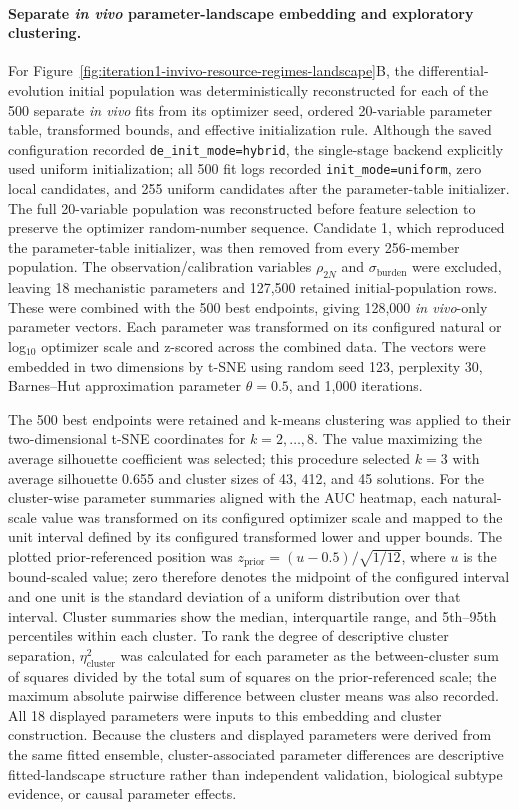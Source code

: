 \documentclass[11pt]{article}
\begin{document}
\paragraph{Separate \textit{in vivo} parameter-landscape embedding and exploratory clustering.}
For Figure~\ref{fig:iteration1-invivo-resource-regimes-landscape}B, the differential-evolution initial population was deterministically reconstructed for each of the 500 separate \textit{in vivo} fits from its optimizer seed, ordered 20-variable parameter table, transformed bounds, and effective initialization rule. Although the saved configuration recorded \texttt{de\_init\_mode=hybrid}, the single-stage backend explicitly used uniform initialization; all 500 fit logs recorded \texttt{init\_mode=uniform}, zero local candidates, and 255 uniform candidates after the parameter-table initializer. The full 20-variable population was reconstructed before feature selection to preserve the optimizer random-number sequence. Candidate 1, which reproduced the parameter-table initializer, was then removed from every 256-member population. The observation/calibration variables \(\rho_{2N}\) and \(\sigma_{\mathrm{burden}}\) were excluded, leaving 18 mechanistic parameters and 127,500 retained initial-population rows. These were combined with the 500 best endpoints, giving 128,000 \textit{in vivo}-only parameter vectors. Each parameter was transformed on its configured natural or log$_{10}$ optimizer scale and z-scored across the combined data. The vectors were embedded in two dimensions by t-SNE using random seed 123, perplexity 30, Barnes--Hut approximation parameter \(\theta=0.5\), and 1,000 iterations.

The 500 best endpoints were retained and k-means clustering was applied to their two-dimensional t-SNE coordinates for \(k=2,\ldots,8\). The value maximizing the average silhouette coefficient was selected; this procedure selected \(k=3\) with average silhouette 0.655 and cluster sizes of 43, 412, and 45 solutions. For the cluster-wise parameter summaries aligned with the AUC heatmap, each natural-scale value was transformed on its configured optimizer scale and mapped to the unit interval defined by its configured transformed lower and upper bounds. The plotted prior-referenced position was \(z_{\mathrm{prior}}=(u-0.5)/\sqrt{1/12}\), where \(u\) is the bound-scaled value; zero therefore denotes the midpoint of the configured interval and one unit is the standard deviation of a uniform distribution over that interval. Cluster summaries show the median, interquartile range, and 5th--95th percentiles within each cluster. To rank the degree of descriptive cluster separation, \(\eta^2_{\mathrm{cluster}}\) was calculated for each parameter as the between-cluster sum of squares divided by the total sum of squares on the prior-referenced scale; the maximum absolute pairwise difference between cluster means was also recorded. All 18 displayed parameters were inputs to this embedding and cluster construction. Because the clusters and displayed parameters were derived from the same fitted ensemble, cluster-associated parameter differences are descriptive fitted-landscape structure rather than independent validation, biological subtype evidence, or causal parameter effects.
\end{document}
